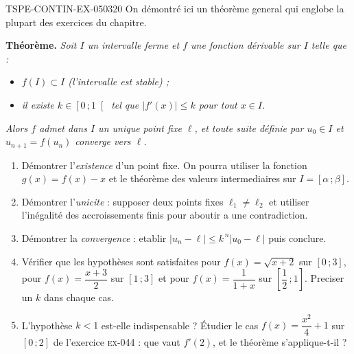\begin{exercice}{TSPE-CONTIN-EX-050}{3}{20}
On démontré ici un théorème general qui englobe la plupart des exercices du chapitre.

\textbf{Théorème.} \emph{Soit $I$ un intervalle ferme et $f$ une fonction dérivable sur $I$ telle que :}
\begin{itemize}
  \item \emph{$f(I) \subset I$ (l'intervalle est stable) ;}
  \item \emph{il existe $k \in \left[0\,;1\right[$ tel que $\left|f'(x)\right| \leq k$ pour tout $x \in I$.}
\end{itemize}
\emph{Alors $f$ admet dans $I$ un unique point fixe $\ell$, et toute suite définie par $u_0 \in I$ et $u_{n+1} = f(u_n)$ converge vers $\ell$.}

\begin{enumerate}
  \item Démontrer l'\emph{existence} d'un point fixe. On pourra utiliser la fonction $g(x) = f(x) - x$ et le théorème des valeurs intermediaires sur $I = [\alpha\,;\beta]$.
  \item Démontrer l'\emph{unicite} : supposer deux points fixes $\ell_1
\neq \ell_2$ et utiliser l'inégalité des accroissements finis pour aboutir a une contradiction.
  \item Démontrer la \emph{convergence} : etablir $\left|u_n - \ell\right| \leq k^{\,n}\left|u_0 - \ell\right|$ puis conclure.
  \item Vérifier que les hypothèses sont satisfaites pour $f(x) = \sqrt{x+2}$ sur $[0\,;3]$, pour $f(x) = \dfrac{x+3}{2}$ sur $[1\,;3]$ et pour $f(x) = \dfrac{1}{1+x}$ sur $\left[\dfrac12\,;1\right]$. Preciser un $k$ dans chaque cas.
  \item L'hypothèse $k < 1$ est-elle indispensable ? Étudier le cas $f(x) = \dfrac{x^2}{4} + 1$ sur $[0\,;2]$ de l'exercice \textsc{ex-044} : que vaut $f'(2)$, et le théorème s'applique-t-il ?
\end{enumerate}
\end{exercice}
